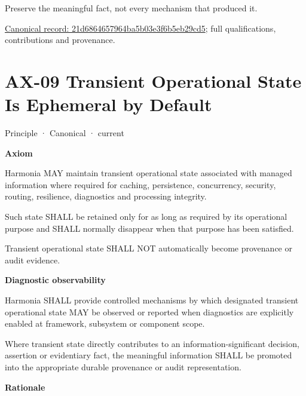 Preserve the meaningful fact, not every mechanism that produced it.


{\footnotesize \href{../../../../continuum/motivation/principle/21d6864657964ba5b03e3f6b5eb29cd5.md}{Canonical record: 21d6864657964ba5b03e3f6b5eb29cd5}; full qualifications, contributions and provenance.}\par
\section{AX-09 Transient Operational State Is Ephemeral by Default}

\label{element:9a5cb9e8876844e58e660f909f7df9fc}
{\small Principle · Canonical · current}\par

\par\medskip\textbf{Axiom}\par


Harmonia MAY maintain transient operational state associated with
managed information where required for caching, persistence,
concurrency, security, routing, resilience, diagnostics and processing
integrity.



Such state SHALL be retained only for as long as required by its
operational purpose and SHALL normally disappear when that purpose has
been satisfied.



Transient operational state SHALL NOT automatically become provenance or
audit evidence.



\par\medskip\textbf{Diagnostic observability}\par


Harmonia SHALL provide controlled mechanisms by which designated
transient operational state MAY be observed or reported when diagnostics
are explicitly enabled at framework, subsystem or component scope.



Where transient state directly contributes to an information-significant
decision, assertion or evidentiary fact, the meaningful information
SHALL be promoted into the appropriate durable provenance or audit
representation.



\par\medskip\textbf{Rationale}\par


